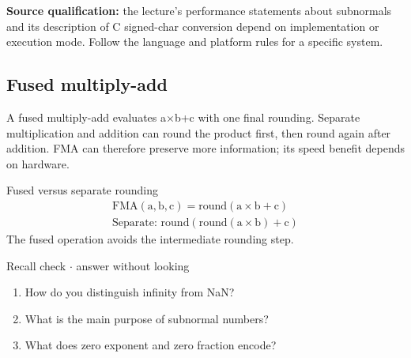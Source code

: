 \documentclass[11pt]{article}
\begin{document}
\begin{keepsection}
\begin{keepsection}
\begin{notebox}\textbf{Source qualification:} the lecture’s performance statements about subnormals and its description of C signed-char conversion depend on implementation or execution mode. Follow the language and platform rules for a specific system.\end{notebox}
\end{keepsection}

\begin{keepsection}
\subsection{Fused multiply-add}

A fused multiply-add evaluates a\ensuremath{\times}b+c with one final rounding. Separate multiplication and addition can round the product first, then round again after addition. FMA can therefore preserve more information; its speed benefit depends on hardware.

\begin{equationcard}{Fused versus separate rounding}
\[ \begin{gathered} \text{FMA}(\mathrm{a},\mathrm{b},\mathrm{c})=\text{round}(\mathrm{a}\times \mathrm{b}+\mathrm{c}) \\ \text{Separate}:\, \text{round}(\text{round}(\mathrm{a}\times \mathrm{b})+\mathrm{c}) \end{gathered} \]
{\small The fused operation avoids the intermediate rounding step.}
\end{equationcard}

\begin{recallbox}{Recall check \ensuremath{\cdot} answer without looking}
\begin{enumerate}
\item How do you distinguish infinity from NaN?
\item What is the main purpose of subnormal numbers?
\item What does zero exponent and zero fraction encode?
\end{enumerate}

\end{recallbox}
\end{keepsection}
\end{keepsection}
\end{document}
